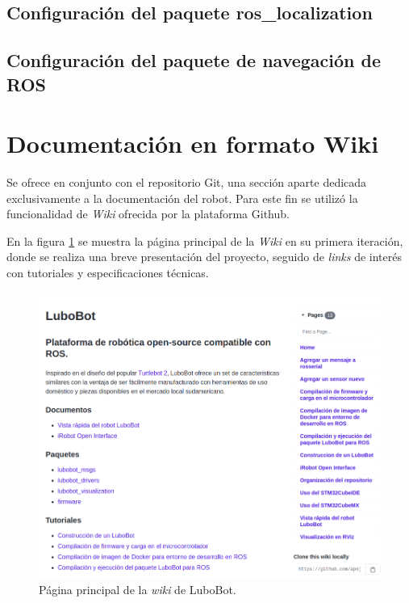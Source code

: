 \subsection{Configuración del paquete ros\_localization}



\subsection{Configuración del paquete de navegación de ROS}

\section{Documentación en formato Wiki}

Se ofrece en conjunto con el repositorio Git\protect\footnotemark[2], una sección aparte dedicada exclusivamente a la documentación del robot. Para este fin se utilizó la funcionalidad de \textit{Wiki} ofrecida por la plataforma Github.



En la figura \ref{fig:wiki} se muestra la página principal de la \textit{Wiki} en su primera iteración, donde se realiza una breve presentación del proyecto, seguido de \textit{links} de interés con tutoriales y especificaciones técnicas.

\begin{figure}[ht]
  \centering
  \includegraphics[scale=0.4]{./Figures/wiki.png}
  \caption{Página principal de la \textit{wiki} de LuboBot.\protect\footnotemark[3]}
  \label{fig:wiki}
\end{figure}

